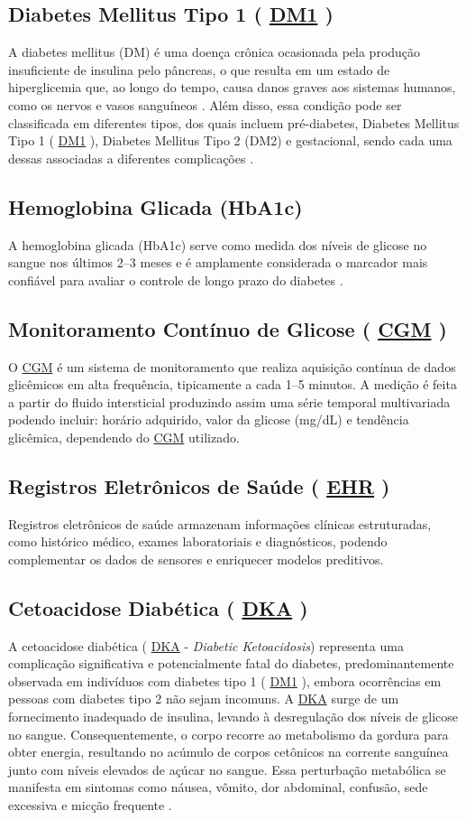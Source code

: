 \documentclass[12pt,a4paper]{article}
\DeclareRobustCommand{\sigla}[1]{%
    \texorpdfstring{\hyperlink{sigla:#1}{#1}}{#1}%
}
\begin{document}
\subsection{Diabetes Mellitus Tipo 1 (\sigla{DM1})}
A diabetes mellitus (DM) é uma doença crônica ocasionada pela produção insuficiente de insulina pelo pâncreas, o que resulta em um estado de hiperglicemia que, ao longo do tempo, causa danos graves aos sistemas humanos, como os nervos e vasos sanguíneos \cite{who2024}. Além disso, essa condição pode ser classificada em diferentes tipos, dos quais incluem pré-diabetes, Diabetes Mellitus Tipo 1 (\sigla{DM1}), Diabetes Mellitus Tipo 2 (DM2) e gestacional, sendo cada uma dessas associadas a diferentes complicações \cite{dacunha2025}.

\subsection{Hemoglobina Glicada (HbA1c)}
A hemoglobina glicada (HbA1c) serve como medida dos níveis de glicose no sangue nos últimos 2–3 meses e é amplamente considerada o marcador mais confiável para avaliar o controle de longo prazo do diabetes \cite{earnest2025}.

\subsection{Monitoramento Contínuo de Glicose (\sigla{CGM})}
O \sigla{CGM} é um sistema de monitoramento que realiza aquisição contínua de dados glicêmicos em alta frequência, tipicamente a cada 1–5 minutos. A medição é feita a partir do fluido intersticial produzindo assim uma série temporal multivariada podendo incluir: horário adquirido, valor da glicose (mg/dL) e tendência glicêmica, dependendo do \sigla{CGM} utilizado.

\subsection{Registros Eletrônicos de Saúde (\sigla{EHR})}
Registros eletrônicos de saúde armazenam informações clínicas estruturadas, como histórico médico, exames laboratoriais e diagnósticos, podendo complementar os dados de sensores e enriquecer modelos preditivos.

\subsection{Cetoacidose Diabética (\sigla{DKA})}
A cetoacidose diabética (\sigla{DKA} - \textit{Diabetic Ketoacidosis}) representa uma complicação significativa e potencialmente fatal do diabetes, predominantemente observada em indivíduos com diabetes tipo 1 (\sigla{DM1}), embora ocorrências em pessoas com diabetes tipo 2 não sejam incomuns. A \sigla{DKA} surge de um fornecimento inadequado de insulina, levando à desregulação dos níveis de glicose no sangue. Consequentemente, o corpo recorre ao metabolismo da gordura para obter energia, resultando no acúmulo de corpos cetônicos na corrente sanguínea junto com níveis elevados de açúcar no sangue. Essa perturbação metabólica se manifesta em sintomas como náusea, vômito, dor abdominal, confusão, sede excessiva e micção frequente \cite[p. 1,2]{cichosz2025}.
\end{document}

